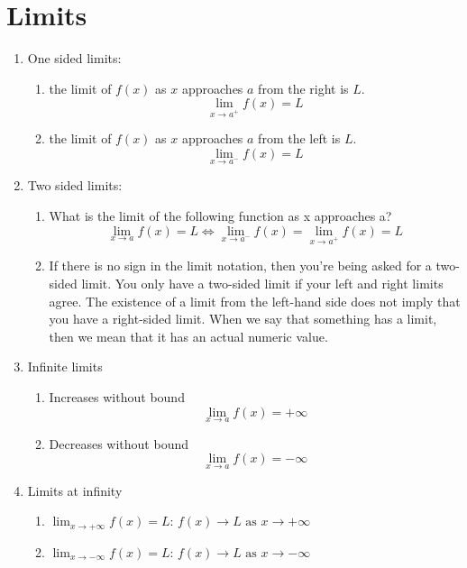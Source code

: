 
\section{Limits}

\begin{myframe}[arc=10pt,auto outer arc]

\begin{enumerate}
\item One sided limits:
	\begin{enumerate}
		\item the limit of $f(x)$ as $x$ approaches $a$ from the right is $L$.
		\[
			\lim_{x\rightarrow a^+} f\left(x\right) = L
		\]
		\item the limit of $f(x)$ as $x$ approaches $a$ from the left is $L$.
		\[
			\lim_{x\rightarrow a^-} f\left(x\right) = L
		\]		
	\end{enumerate}
\item Two sided limits:

    \begin{enumerate}
    \item What is the limit of the following function as x approaches a?
    \[
    	\lim_{x\rightarrow a} f\left(x\right) = L \iff \lim_{x\rightarrow a^-} f\left(x\right) = \lim_{x\rightarrow a^+} f\left(x\right) = L
    \]
    
    \item If there is no sign in the limit notation, then you’re being asked for a two-sided limit. You only have a two-sided limit if your left and right limits agree. The existence of a limit from the left-hand side does not imply that you have a right-sided limit.
    When we say that something has a limit, then we mean that it has an actual numeric value.
    \end{enumerate}
    
\item Infinite limits
	\begin{enumerate}
		\item Increases without bound
		\[ \lim_{x \rightarrow a} f(x) = +\infty \]
		\item Decreases without bound
		\[ \lim_{x \rightarrow a} f(x) = -\infty \]
	\end{enumerate}

\item Limits at infinity
	\begin{enumerate}
	\item $\displaystyle \lim_{x \rightarrow +\infty} f(x) = L$: $\displaystyle f(x) \rightarrow L \textrm{ as } x \rightarrow +\infty$
	\item $\displaystyle \lim_{x \rightarrow -\infty} f(x) = L$: $\displaystyle f(x) \rightarrow L \textrm{ as } x \rightarrow -\infty$
	\end{enumerate}


\end{enumerate}
\end{myframe}
